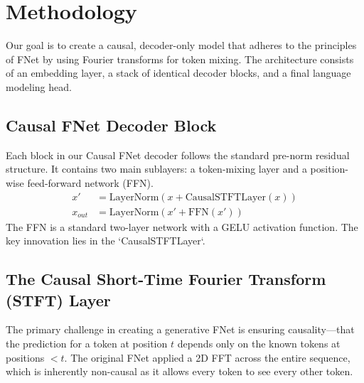 \documentclass[11pt,a4paper]{article}
\begin{document}
\section{Methodology}
Our goal is to create a causal, decoder-only model that adheres to the principles of FNet by using Fourier transforms for token mixing. The architecture consists of an embedding layer, a stack of identical decoder blocks, and a final language modeling head.

\subsection{Causal FNet Decoder Block}
Each block in our Causal FNet decoder follows the standard pre-norm residual structure. It contains two main sublayers: a token-mixing layer and a position-wise feed-forward network (FFN).
\begin{align}
    x' &= \text{LayerNorm}(x + \text{CausalSTFTLayer}(x)) \\
    x_{out} &= \text{LayerNorm}(x' + \text{FFN}(x'))
\end{align}
The FFN is a standard two-layer network with a GELU activation function. The key innovation lies in the `CausalSTFTLayer`.

\subsection{The Causal Short-Time Fourier Transform (STFT) Layer}
The primary challenge in creating a generative FNet is ensuring causality—that the prediction for a token at position $t$ depends only on the known tokens at positions $<t$. The original FNet applied a 2D FFT across the entire sequence, which is inherently non-causal as it allows every token to see every other token.
\end{document}
